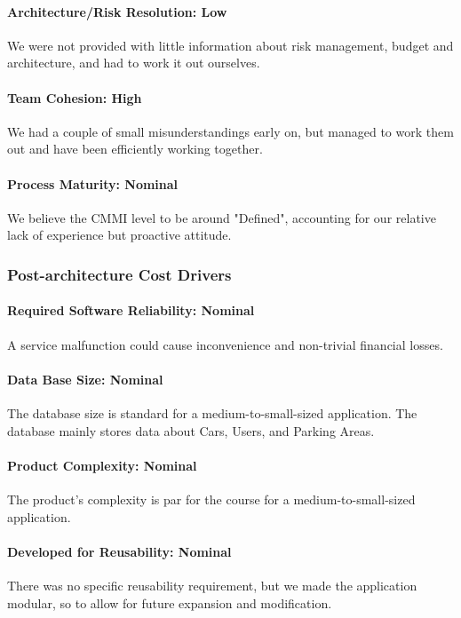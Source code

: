 \paragraph*{Architecture/Risk Resolution: Low}
We were not provided with little information about risk management, budget and architecture, and had to work it out ourselves.

\paragraph*{Team Cohesion: High}
We had a couple of small misunderstandings early on, but managed to work them out and have been efficiently working together.

\paragraph*{Process Maturity: Nominal}
We believe the CMMI level to be around "Defined", accounting for our relative lack of experience but proactive attitude.

\subsubsection{Post-architecture Cost Drivers}
\paragraph*{Required Software Reliability: Nominal}
A service malfunction could cause inconvenience and non-trivial financial losses.

\paragraph*{Data Base Size: Nominal}
The database size is standard for a medium-to-small-sized application. The database mainly stores data about Cars, Users, and Parking Areas.

\paragraph*{Product Complexity: Nominal}
The product's complexity is par for the course for a medium-to-small-sized application.

\paragraph*{Developed for Reusability: Nominal}
There was no specific reusability requirement, but we made the application modular, so to allow for future expansion and modification.

